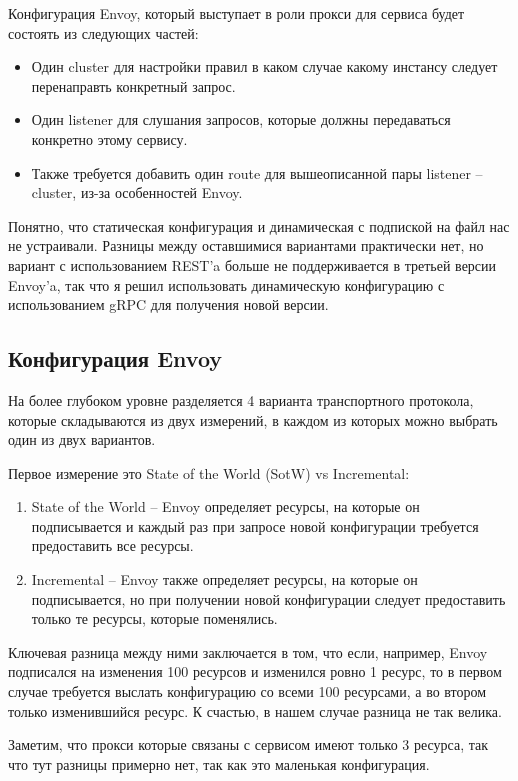 Конфигурация Envoy, который выступает в роли прокси для сервиса будет состоять из следующих частей:
\begin{itemize}
	\item Один cluster для настройки правил в каком случае какому инстансу следует перенаправть конкретный запрос.
	\item Один listener для слушания запросов, которые должны передаваться конкретно этому сервису.
	\item Также требуется добавить один route для вышеописанной пары listener -- cluster, из-за особенностей Envoy.
\end{itemize}

Понятно, что статическая конфигурация и динамическая с подпиской на файл нас не устраивали. Разницы между оставшимися вариантами практически нет, но вариант с использованием REST'a больше не поддерживается в третьей версии Envoy'a, так что я решил использовать динамическую конфигурацию с использованием gRPC для получения новой версии.

\subsection{Конфигурация Envoy}
На более глубоком уровне разделяется 4 варианта транспортного протокола, которые складываются из двух измерений, в каждом из которых можно выбрать один из двух вариантов.

Первое измерение это State of the World (SotW) vs Incremental:
\begin{enumerate}
	\item State of the World -- Envoy определяет ресурсы, на которые он подписывается и каждый раз при запросе новой конфигурации требуется предоставить все ресурсы.
	\item Incremental -- Envoy также определяет ресурсы, на которые он подписывается, но при получении новой конфигурации следует предоставить только те ресурсы, которые поменялись.
\end{enumerate}
Ключевая разница между ними заключается в том, что если, например, Envoy подписался на изменения 100 ресурсов и изменился ровно 1 ресурс, то в первом случае требуется выслать конфигурацию со всеми 100 ресурсами, а во втором только изменившийся ресурс. К счастью, в нашем случае разница не так велика. 

Заметим, что прокси которые связаны с сервисом имеют только 3 ресурса, так что тут разницы примерно нет, так как это маленькая конфигурация.

